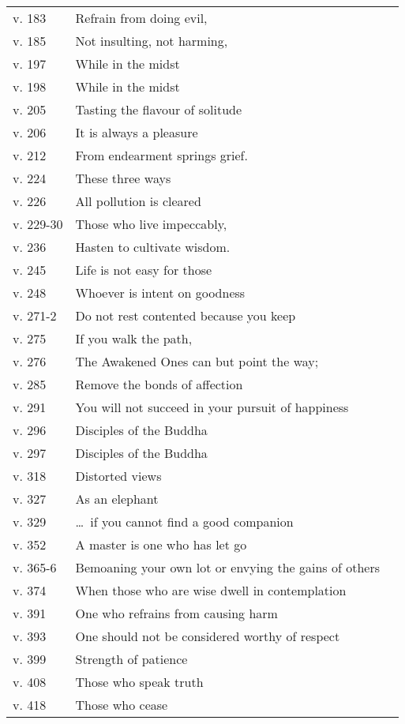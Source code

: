 {\begin{longtable}[c]{llr}
v. 183 & Refrain from doing evil, & \pageref{dhp-183}\\
v. 185 & Not insulting, not harming, & \pageref{dhp-185}\\
v. 197 & While in the midst & \pageref{dhp-197}\\
v. 198 & While in the midst & \pageref{dhp-198}\\
v. 205 & Tasting the flavour of solitude & \pageref{dhp-205}\\
v. 206 & It is always a pleasure & \pageref{dhp-206}\\
v. 212 & From endearment springs grief. & \pageref{dhp-212}\\
v. 224 & These three ways & \pageref{dhp-224}\\
v. 226 & All pollution is cleared & \pageref{dhp-226}\\
v. 229-30 & Those who live impeccably, & \pageref{dhp-229}\\
v. 236 & Hasten to cultivate wisdom. & \pageref{dhp-236}\\
v. 245 & Life is not easy for those & \pageref{dhp-245}\\
v. 248 & Whoever is intent on goodness & \pageref{dhp-248}\\
v. 271-2 & Do not rest contented because you keep & \pageref{dhp-271}\\
v. 275 & If you walk the path, & \pageref{dhp-275}\\
v. 276 & The Awakened Ones can but point the way; & \pageref{dhp-276}\\
v. 285 & Remove the bonds of affection & \pageref{dhp-285}\\
v. 291 & You will not succeed in your pursuit of happiness & \pageref{dhp-291}\\
v. 296 & Disciples of the Buddha & \pageref{dhp-296}\\
v. 297 & Disciples of the Buddha & \pageref{dhp-297}\\
v. 318 & Distorted views & \pageref{dhp-318}\\
v. 327 & As an elephant & \pageref{dhp-327}\\
v. 329 & \ldots\ if you cannot find a good companion & \pageref{dhp-329}\\
v. 352 & A master is one who has let go & \pageref{dhp-352}\\
v. 365-6 & Bemoaning your own lot or envying the gains of others & \pageref{dhp-365}\\
v. 374 & When those who are wise dwell in contemplation & \pageref{dhp-374}\\
v. 391 & One who refrains from causing harm & \pageref{dhp-391}\\
v. 393 & One should not be considered worthy of respect & \pageref{dhp-393}\\
v. 399 & Strength of patience & \pageref{dhp-399}\\
v. 408 & Those who speak truth & \pageref{dhp-408}\\
v. 418 & Those who cease & \pageref{dhp-418}\\
\end{longtable}

}

